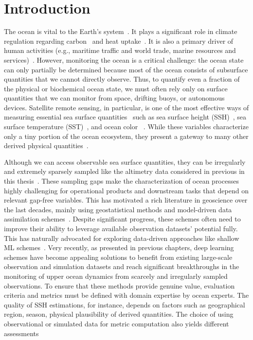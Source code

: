 \section{Introduction}

The ocean is vital to the Earth's system~\cite{OCEANWARMING}. 
It plays a significant role in climate regulation regarding carbon~\cite{OCEANCARBONCYCLE} and heat uptake~\cite{OCEANHEATUPTAKE}. It is also a primary driver of human activities (e.g., maritime traffic and world trade, marine resources and services)~\cite{SSHOPERATIONAL, ML4OCN}. 
However, monitoring the ocean is a critical challenge: the ocean state can only partially be determined because most of the ocean consists of subsurface quantities that we cannot directly observe. 
Thus, to quantify even a fraction of the physical or biochemical ocean state, we must often rely only on surface quantities that we can monitor from space, drifting buoys, or autonomous devices.
Satellite remote sensing, in particular, is one of the most effective ways of measuring essential sea surface quantities~\cite{Altimetry} such as sea surface height (SSH)~\cite{DUACS}, sea surface temperature (SST)~\cite{OCEANSATELLITESST}, and ocean color ~\cite{OCEANSATELLITEOC}. 
While these variables characterize only a tiny portion of the ocean ecosystem, they present a gateway to many other derived physical quantities~\cite{ML4OCN}.


Although we can access observable sea surface quantities, they can be irregularly and extremely sparsely sampled like the altimetry data considered in previous in this thesis~\cite{DUACS}. 
These sampling gaps make the characterization of ocean processes highly challenging for operational products and downstream tasks that depend on relevant gap-free variables. This has motivated a rich literature in geoscience over the last decades, mainly using geostatistical methods \cite{DUACS, MIOST} and model-driven data assimilation schemes~\cite{BFNQG, GLORYS12}. Despite significant progress, these schemes often need to improve their ability to leverage available observation datasets' potential fully. 
This has naturally advocated for exploring data-driven approaches like shallow ML schemes~\cite{DINEOF, DINEOF2, ANALOGDA2, ANALOGDA}. Very recently, as presented in previous chapters, deep learning schemes \cite{SSHInterpAttention, SSHInterpConvLSTM, SSHInterpUNet} have become appealing solutions to benefit from existing large-scale observation and simulation datasets and reach significant breakthroughs in the monitoring of upper ocean dynamics from scarcely and irregularly sampled observations. 
To ensure that these methods provide genuine value, evaluation criteria and metrics must be defined with domain expertise by ocean experts. The quality of SSH estimations, for instance, depends on factors such as geographical region, season, physical plausibility of derived quantities. The choice of using observational or simulated data for metric computation also yields different assessments


